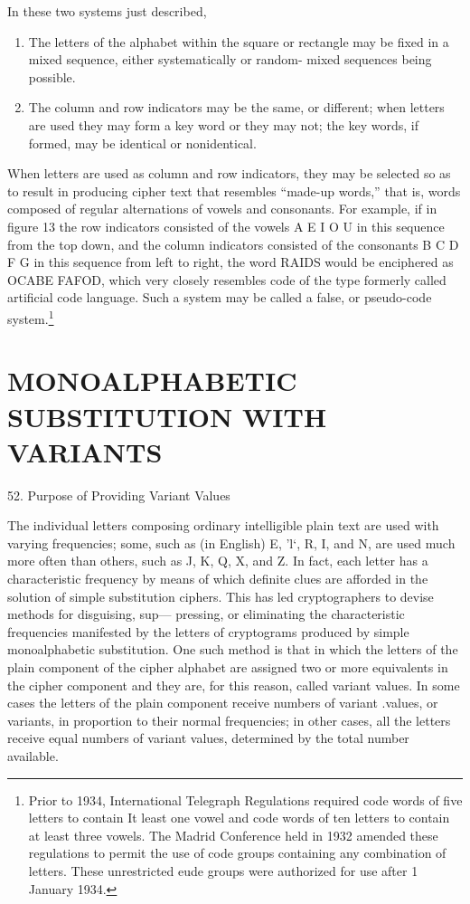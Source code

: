 \mypara In these two systems just described,

\begin{enumerate}
\item The letters of the alphabet within the square or rectangle may
be ﬁxed in a mixed sequence, either systematically or random-
mixed sequences being possible.

\item The column and row indicators may be the same, or different;
when letters are used they may form a key word or they may
not; the key words, if formed, may be identical or nonidentical.
\end{enumerate}

\mypara When letters are used as column and row indicators, they may be
selected so as to result in producing cipher text that resembles “made-up
words,” that is, words composed of regular alternations of vowels and
consonants. For example, if in ﬁgure 13 the row indicators consisted of
the vowels A E I O U in this sequence from the top down, and the
column indicators consisted of the consonants B C D F G in this
sequence from left to right, the word RAIDS would be enciphered as
OCABE FAFOD, which very closely resembles code of the type formerly called artiﬁcial code language. Such a system may be called a
false, or pseudo-code system.\footnote{Prior to 1934, International Telegraph Regulations required code words of ﬁve letters to contain It least one vowel and code words of ten letters to contain at least three vowels. The Madrid Conference held in 1932 amended these regulations to permit the use of code groups containing any combination of letters. These unrestricted eude groups were authorized for use after 1 January 1934.}

\section{MONOALPHABETIC SUBSTITUTION WITH VARIANTS}

52. Purpose of Providing Variant Values

The individual letters composing ordinary intelligible plain text are
used with varying frequencies; some, such as (in English) E, 'l‘, R, I,
and N, are used much more often than others, such as J, K, Q, X, and Z.
In fact, each letter has a characteristic frequency by means of which
deﬁnite clues are afforded in the solution of simple substitution ciphers.
This has led cryptographers to devise methods for disguising, sup—
pressing, or eliminating the characteristic frequencies manifested by the
letters of cryptograms produced by simple monoalphabetic substitution.
One such method is that in which the letters of the plain component of
the cipher alphabet are assigned two or more equivalents in the cipher
component and they are, for this reason, called variant values. In some
cases the letters of the plain component receive numbers of variant
.values, or variants, in proportion to their normal frequencies; in other
cases, all the letters receive equal numbers of variant values, determined
by the total number available.

